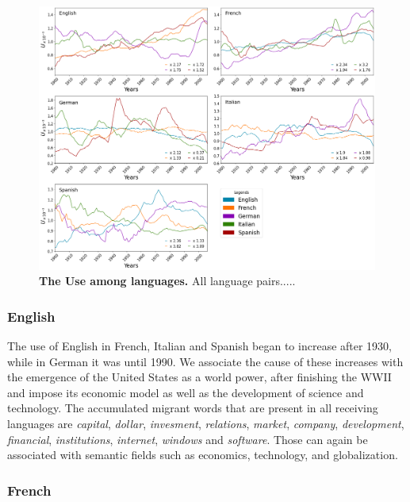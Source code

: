 \documentclass[10pt,letterpaper]{article} %
\begin{document}
\begin{figure}[!h]
	\begin{adjustwidth}{-6cm}{1cm}
		\centering
		\includegraphics[scale=0.38]{USO_A.png}
		\caption{{\bf The Use among languages.} All language pairs.....}
		\label{fig.UT_art}
	\end{adjustwidth}
\end{figure}
\subsubsection*{English} %

The use of English in French, Italian and Spanish began to increase after 1930, while in German it was until 1990. We associate the cause of these increases with the emergence of the United States as a world power, after finishing the WWII and  impose its economic model as well as the development of science and technology. The accumulated migrant words that are present in all receiving  languages are \textit{capital}, \textit{dollar}, \textit{invesment}, \textit{relations}, \textit{market}, \textit{company}, \textit{development}, \textit{financial},  \textit{institutions}, \textit{internet}, \textit{windows} and \textit{software}. Those can again be associated with semantic fields such as economics, technology, and globalization.

\subsubsection*{French} %
\end{document}

